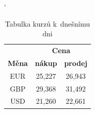 \documentclass[a4paper, 11pt]{article}
\begin{document}
\bigskip
\begin{table}[h]
	\catcode`
	\centering
	\begin{tabular}{|c|c|c|} \hline
		              & \multicolumn{2}{c|}{\textbf{Cena}}                   \\ \cline{2-3}
		\textbf{Měna} & \textbf{nákup}                     & \textbf{prodej} \\ \hline
		EUR           & 25,227                             & 26,943          \\
		GBP           & 29,368                             & 31,492          \\
		USD           & 21,260                             & 22,661          \\ \hline
	\end{tabular}
	\caption{Tabulka kurzů k~dnešnímu dni}
	\label{tab:kurz}
\end{table}
\bigskip
\end{document}

